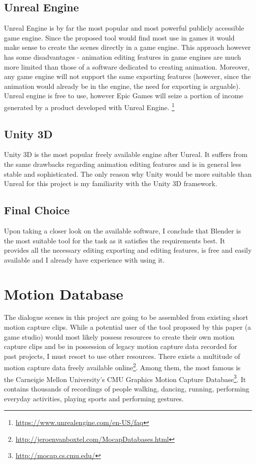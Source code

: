 \subsection{Unreal Engine}

Unreal Engine is by far the most popular and most powerful publicly accessible game engine. Since the proposed tool would find most use in games it would make sense to create the scenes directly in a game engine. This approach however has some disadvantages - animation editing features in game engines are much more limited than those of a software dedicated to creating animation. Moreover, any game engine will not support the same exporting features (however, since the animation would already be in the engine, the need for exporting is arguable). Unreal engine is free to use, however Epic Games will seize a portion of income generated by a product developed with Unreal Engine. \footnote{\url{https://www.unrealengine.com/en-US/faq}}

\subsection{Unity 3D}

Unity 3D is the most popular freely available engine after Unreal. It suffers from the same drawbacks regarding animation editing features and is in general less stable and sophisticated. The only reason why Unity would be more suitable than Unreal for this project is my familiarity with the Unity 3D framework.


\subsection{Final Choice}

Upon taking a closer look on the available software, I conclude that Blender is the most suitable tool for the task as it satisfies the requirements best. It provides all the necessary editing exporting and editing features, is free and easily available and I already have experience with using it.



\section{Motion Database}

The dialogue scenes in this project are going to be assembled from existing short motion capture clips. While a potential user of the tool proposed by this paper (a game studio) would most likely possess resources to create their own motion capture clips and be in possession of legacy motion capture data recorded for past projects, I must resort to use other resources. There exists a multitude of motion capture data freely available online\footnote{\url{http://jeroenvanboxtel.com/MocapDatabases.html}}. Among them, the most famous is the Carneigie Mellon University's CMU Graphics Motion Capture Database\footnote{\url{http://mocap.cs.cmu.edu/}}. It contains thousands of recordings of people walking, dancing, running, performing everyday activities, playing sports and performing gestures.

